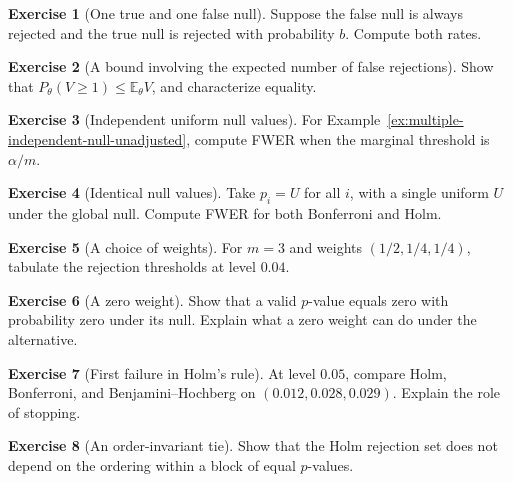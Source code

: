 \documentclass[11pt,oneside]{book}
\theoremstyle{definition}
\newtheorem{exercise}{Exercise}[section]
\theoremstyle{remark}
\begin{document}
\begin{exercise}[One true and one false null]
\label{exer:multiple-two-null-rates}
Suppose the false null is always rejected and the true null is rejected with probability $b$. Compute both rates.
\end{exercise}

\begin{exercise}[A bound involving the expected number of false rejections]
\label{exer:multiple-expected-false-count}
Show that $P_\theta(V\geq1)\leq\mathbb E_\theta V$, and characterize equality.
\end{exercise}

\begin{exercise}[Independent uniform null values]
\label{exer:multiple-independent-bonferroni}
For Example~\ref{ex:multiple-independent-null-unadjusted}, compute FWER when the marginal threshold is $\alpha/m$.
\end{exercise}

\begin{exercise}[Identical null values]
\label{exer:multiple-identical-pvalues}
Take $p_i=U$ for all $i$, with a single uniform $U$ under the global null. Compute FWER for both Bonferroni and Holm.
\end{exercise}

\begin{exercise}[A choice of weights]
\label{exer:multiple-weights}
For $m=3$ and weights $(1/2,1/4,1/4)$, tabulate the rejection thresholds at level $0.04$.
\end{exercise}

\begin{exercise}[A zero weight]
\label{exer:multiple-zero-weight}
Show that a valid $p$-value equals zero with probability zero under its null. Explain what a zero weight can do under the alternative.
\end{exercise}

\begin{exercise}[First failure in Holm's rule]
\label{exer:multiple-holm-first-failure}
At level $0.05$, compare Holm, Bonferroni, and Benjamini--Hochberg
on $(0.012,0.028,0.029)$. Explain the role of stopping.
\end{exercise}

\begin{exercise}[An order-invariant tie]
\label{exer:multiple-holm-tie}
Show that the Holm rejection set does not depend on the ordering within a block of equal $p$-values.
\end{exercise}
\end{document}
